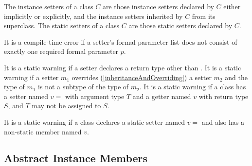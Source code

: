 \documentclass{article}
\begin{document}

\LMHash{}
The instance setters of a class $C$ are those instance setters declared by $C$ either implicitly or explicitly, and the instance setters inherited by $C$ from its superclass.
The static setters of a class $C$ are those static setters declared by $C$.

\LMHash{}
It is a compile-time error if a setter's formal parameter list does not consist of exactly one required formal parameter $p$.


\LMHash{}
It is a static warning if a setter declares a return type other than \VOID{}.
It is a static warning if a setter $m_1$ overrides (\ref{inheritanceAndOverriding}) a setter $m_2$ and the type of $m_1$ is not a subtype of the type of $m_2$.
It is a static warning if a class has a setter named $v=$ with argument type $T$ and a getter named $v$ with return type $S$, and $T$ may not be assigned to $S$.

\LMHash{}
It is a static warning if a class declares a static setter named $v=$ and also has a non-static member named $v$.



\subsection{Abstract Instance Members}
\end{document}
